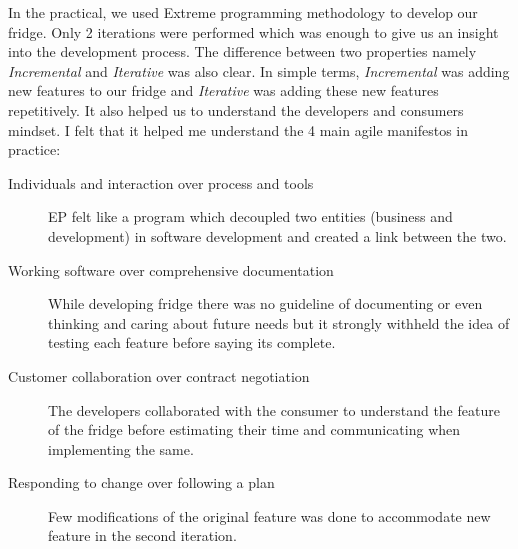 In the practical, we used Extreme programming methodology to develop our fridge. Only 2 iterations were performed which was enough to give us an insight into the development process. The difference between two properties namely \textit{Incremental} and \textit{Iterative} was also clear. In simple terms, \textit{Incremental} was adding new features to our fridge and \textit{Iterative} was adding these new features repetitively. It also helped us to understand the developers and consumers mindset. I felt that it helped me understand the 4 main agile manifestos in practice:
\begin{description}
    \item [Individuals and interaction over process and tools] EP felt like a program which decoupled two entities (business and development) in software development and created a link between the two.
    \item [Working software over comprehensive documentation] While developing fridge there was no guideline of documenting or even thinking and caring about future needs but it strongly withheld the idea of testing each feature before saying its complete.
    \item [Customer collaboration over contract negotiation] The developers collaborated with the consumer to understand the feature of the fridge before estimating their time and communicating when implementing the same.
    \item [Responding to change over following a plan] Few modifications of the original feature was done to accommodate new feature in the second iteration.
\end{description}

